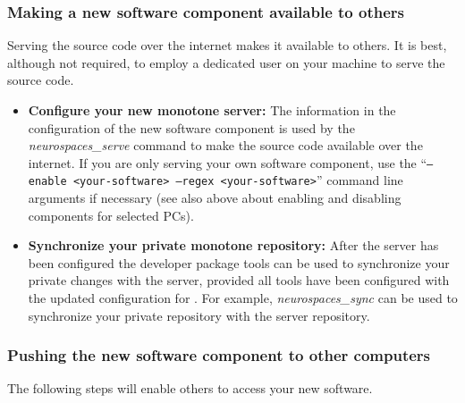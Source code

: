 \documentclass[12pt]{article}
\begin{document}
\subsubsection*{Making a new software component available to others}

Serving the source code over the internet makes it available to
others.  It is best, although not required, to employ a dedicated user on
your machine to serve the source code.

\begin{itemize}
\item {\bf Configure your new monotone server:} The information in the
  configuration of the new software component is used by the {\it
    neurospaces\_serve} command to make the source code available over
  the internet.  If you are only serving your own software component,
  use the ``{\tt --enable <your-software> --regex <your-software>}''
  command line arguments if necessary (see also above about enabling
  and disabling components for selected PCs).
  
\item {\bf Synchronize your private monotone repository:} After the
  server has been configured the developer package tools can be used to
  synchronize your private changes with the server, provided all tools
  have been configured with the updated configuration for
  {\tt <your-software>}.  For example, {\it neurospaces\_sync} can be used
  to synchronize your private repository with the server repository.
\end{itemize}
  
\subsubsection*{Pushing the new software component to other computers}

The following steps will enable others to access your new software.
\end{document}
